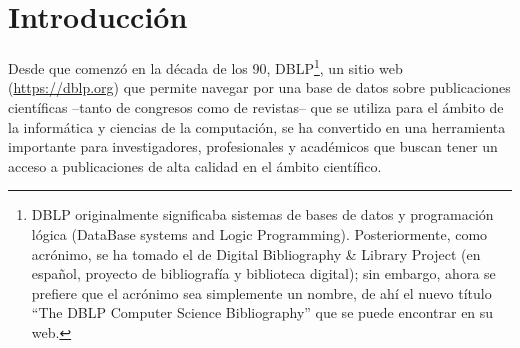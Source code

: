 \documentclass[a4paper, 12pt]{book}
\begin{document}


\tableofcontents 
\cleardoublepage
\listoffigures %



\cleardoublepage
\chapter{Introducción}
\label{sec:intro} %

Desde que comenzó en la década de los 90, DBLP\footnote{DBLP originalmente significaba sistemas de bases de datos y programación lógica (DataBase systems and Logic Programming). Posteriormente, como acrónimo, se ha tomado el de Digital Bibliography \& Library Project (en español, proyecto de bibliografía y biblioteca digital); sin embargo, ahora se prefiere que el acrónimo sea simplemente un nombre, de ahí el nuevo título ``The DBLP Computer Science Bibliography'' que se puede encontrar en su web.}, un sitio web (\url{https://dblp.org}) que permite navegar por una base de datos sobre publicaciones científicas --tanto de congresos como de revistas-- que se utiliza para el ámbito de la informática y ciencias de la computación, se ha convertido en una herramienta importante para investigadores, profesionales y académicos que buscan tener un acceso a publicaciones de alta calidad en el ámbito científico.
\end{document}
